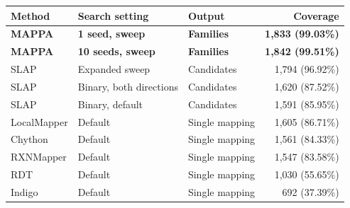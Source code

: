 \begin{tabular}{@{}lllr@{}}\toprule
Method & Search setting & Output & Coverage\\\midrule
\textbf{MAPPA} & \textbf{1 seed, sweep} & \textbf{Families} & \textbf{1,833 (99.03\%)}\\
\textbf{MAPPA} & \textbf{10 seeds, sweep} & \textbf{Families} & \textbf{1,842 (99.51\%)}\\
SLAP & Expanded sweep & Candidates & 1,794 (96.92\%)\\
SLAP & Binary, both directions & Candidates & 1,620 (87.52\%)\\
SLAP & Binary, default & Candidates & 1,591 (85.95\%)\\
LocalMapper & Default & Single mapping & 1,605 (86.71\%)\\
Chython & Default & Single mapping & 1,561 (84.33\%)\\
RXNMapper & Default & Single mapping & 1,547 (83.58\%)\\
RDT & Default & Single mapping & 1,030 (55.65\%)\\
Indigo & Default & Single mapping & 692 (37.39\%)\\
\bottomrule\end{tabular}
